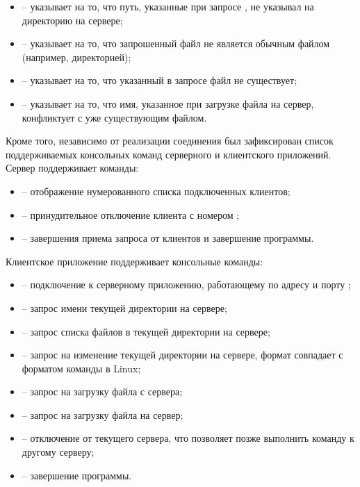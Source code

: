 \begin{itemize}
\begin{itemize}
		\item {} -- указывает на то, что путь, указанные при запросе , не указывал на директорию на сервере;
		\item {} -- указывает на то, что запрошенный файл не является обычным файлом (например, директорией);
		\item {} -- указывает на то, что указанный в запросе файл не существует;
		\item {} -- указывает на то, что имя, указанное при загрузке файла на сервер, конфликтует с уже существующим файлом.
	\end{itemize}
\end{itemize}

Кроме того, независимо от реализации соединения был зафиксирован список поддерживаемых консольных команд серверного и клиентского приложений. Сервер поддерживает команды:
\begin{itemize}
	\item {} -- отображение нумерованного списка подключенных клиентов;
	\item {} -- принудительное отключение клиента с номером ;
	\item {} -- завершения приема запроса от клиентов и завершение программы.
\end{itemize}

\noindent Клиентское приложение поддерживает консольные команды:
\begin{itemize}
	\item {} -- подключение к серверному приложению, работающему по адресу  и порту ;
	\item {} -- запрос имени текущей директории на сервере;
	\item {} -- запрос списка файлов в текущей директории на сервере;
	\item {} -- запрос на изменение текущей директории на сервере, формат совпадает с форматом команды  в Linux;
	\item {} -- запрос на загрузку файла  с сервера;
	\item {} -- запрос на загрузку файла  на сервер;
	\item {} -- отключение от текущего сервера, что позволяет позже выполнить команду  к другому серверу;
	\item {} -- завершение программы.
\end{itemize}

